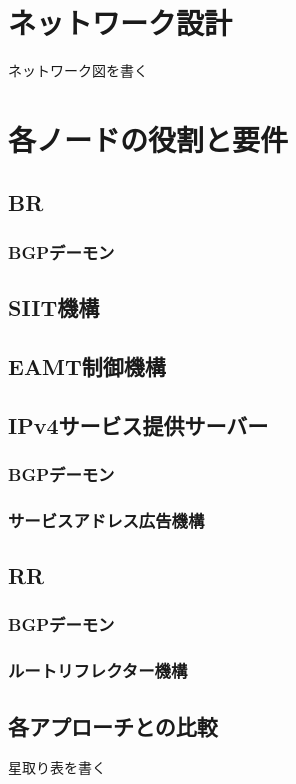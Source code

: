 \section{ネットワーク設計}
ネットワーク図を書く

\section{各ノードの役割と要件}
\subsection{BR}

\subsubsection{BGPデーモン}
\subsection{SIIT機構}
\subsection{EAMT制御機構}



\subsection{IPv4サービス提供サーバー}
\subsubsection{BGPデーモン}
\subsubsection{サービスアドレス広告機構}


\subsection{RR}
\subsubsection{BGPデーモン}
\subsubsection{ルートリフレクター機構}

\subsection{各アプローチとの比較}
星取り表を書く

